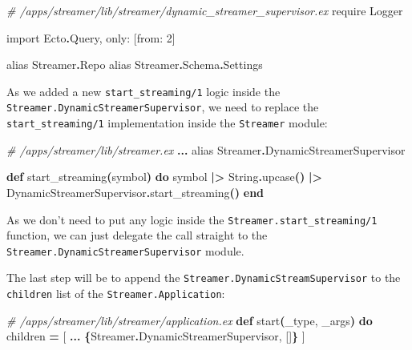 \documentclass[
  oneside]{book}
\newenvironment{Shaded}{\begin{snugshade}}{\end{snugshade}}
\newcommand{\CommentTok}[1]{\textcolor[rgb]{0.56,0.35,0.01}{\textit{#1}}}
\newcommand{\ConstantTok}[1]{\textcolor[rgb]{0.56,0.35,0.01}{#1}}
\newcommand{\DecValTok}[1]{\textcolor[rgb]{0.00,0.00,0.81}{#1}}
\newcommand{\FunctionTok}[1]{\textcolor[rgb]{0.13,0.29,0.53}{\textbf{#1}}}
\newcommand{\ImportTok}[1]{#1}
\newcommand{\KeywordTok}[1]{\textcolor[rgb]{0.13,0.29,0.53}{\textbf{#1}}}
\newcommand{\NormalTok}[1]{#1}
\newcommand{\OperatorTok}[1]{\textcolor[rgb]{0.81,0.36,0.00}{\textbf{#1}}}
\newcommand{\OtherTok}[1]{\textcolor[rgb]{0.56,0.35,0.01}{#1}}
\newcommand{\VariableTok}[1]{\textcolor[rgb]{0.00,0.00,0.00}{#1}}
\begin{document}
\begin{Shaded}
\begin{Highlighting}[]
\CommentTok{\# /apps/streamer/lib/streamer/dynamic\_streamer\_supervisor.ex}
  \ImportTok{require} \ConstantTok{Logger}

  \ImportTok{import} \ConstantTok{Ecto}\OperatorTok{.}\ConstantTok{Query}\NormalTok{, }\VariableTok{only:} \OtherTok{[}\VariableTok{from:} \DecValTok{2}\OtherTok{]}

  \ImportTok{alias} \ConstantTok{Streamer}\OperatorTok{.}\ConstantTok{Repo}
  \ImportTok{alias} \ConstantTok{Streamer}\OperatorTok{.}\ConstantTok{Schema}\OperatorTok{.}\ConstantTok{Settings}
\end{Highlighting}
\end{Shaded}

\newpage

As we added a new \texttt{start\_streaming/1} logic inside the \texttt{Streamer.DynamicStreamerSupervisor}, we need to replace the \texttt{start\_streaming/1} implementation inside the \texttt{Streamer} module:

\begin{Shaded}
\begin{Highlighting}[]
\CommentTok{\# /apps/streamer/lib/streamer.ex}
  \OperatorTok{...}
  \ImportTok{alias} \ConstantTok{Streamer}\OperatorTok{.}\ConstantTok{DynamicStreamerSupervisor}

  \KeywordTok{def}\NormalTok{ start\_streaming}\FunctionTok{(}\NormalTok{symbol}\FunctionTok{)} \KeywordTok{do}
\NormalTok{    symbol}
    \OperatorTok{|\textgreater{}} \ConstantTok{String}\OperatorTok{.}\NormalTok{upcase}\FunctionTok{()}
    \OperatorTok{|\textgreater{}} \ConstantTok{DynamicStreamerSupervisor}\OperatorTok{.}\NormalTok{start\_streaming}\FunctionTok{()}
  \KeywordTok{end}
\end{Highlighting}
\end{Shaded}

As we don't need to put any logic inside the \texttt{Streamer.start\_streaming/1} function, we can just delegate the call straight to the \texttt{Streamer.DynamicStreamerSupervisor} module.

The last step will be to append the \texttt{Streamer.DynamicStreamSupervisor} to the \texttt{children} list of the \texttt{Streamer.Application}:

\begin{Shaded}
\begin{Highlighting}[]
  \CommentTok{\# /apps/streamer/lib/streamer/application.ex}
  \KeywordTok{def}\NormalTok{ start}\FunctionTok{(}\NormalTok{\_type, \_args}\FunctionTok{)} \KeywordTok{do}
\NormalTok{    children }\OperatorTok{=} \OtherTok{[}
      \OperatorTok{...}
      \FunctionTok{\{}\ConstantTok{Streamer}\OperatorTok{.}\ConstantTok{DynamicStreamerSupervisor}\NormalTok{, }\OtherTok{[]}\FunctionTok{\}}
    \OtherTok{]}
\end{Highlighting}
\end{Shaded}
\end{document}

